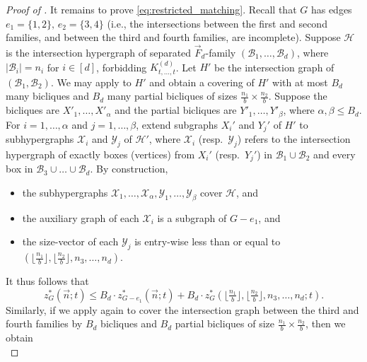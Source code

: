 \documentclass[11pt]{article}
\theoremstyle{definition}
\newcommand*{\cH}{\mathcal{H}}
\newcommand*{\vF}{\vec{F}}
\newcommand*{\cB}{\mathcal{B}}
\newcommand*{\cX}{\mathcal{X}}
\newcommand*{\cY}{\mathcal{Y}}
\newcommand*{\vn}{\vec{n}}
\begin{document}
\begin{proof}[Proof of ]
    It remains to prove \eqref{eq:restricted_matching}. Recall that $G$ has edges $e_1 = \{1, 2\}, \, e_2 = \{3, 4\}$ (i.e., the intersections between the first and second families, and between the third and fourth families, are incomplete). Suppose $\cH$ is the intersection hypergraph of separated $\vF_d$-family $(\cB_1, \dots, \cB_d)$, where $|\cB_i| = n_i$ for $i \in [d]$, forbidding $K_{t, \dots, t}^{(d)}$. Let $H'$ be the intersection graph of $(\cB_1, \cB_2)$. We may apply  to $H'$ and obtain a covering of $H'$ with at most $B_d$ many bicliques and $B_d$ many partial bicliques of sizes $\frac{n_1}{b} \times \frac{n_2}{b}$. Suppose the bicliques are $X'_1, \dots, X'_{\alpha}$ and the partial bicliques are $Y'_1, \dots, Y'_{\beta}$, where $\alpha, \beta \le B_d$. For $i = 1, \dots, \alpha$ and $j = 1, \dots, \beta$, extend subgraphs $X_i'$ and $Y_j'$ of $H'$ to subhypergraphs $\cX_i$ and $\cY_j$ of $\cH'$, where $\cX_i$ (resp.~$\cY_j$) refers to the intersection hypergraph of exactly boxes (vertices) from $X_i'$ (resp.~$Y_j'$) in $\cB_1 \cup \cB_2$ and every box in $\cB_3 \cup \dots \cup \cB_d$. By construction, 
    \vspace{-0.5em}
    \begin{itemize}
        \item the subhypergraphs $\cX_1, \dots, \cX_{\alpha}, \cY_1, \dots, \cY_{\beta}$ cover $\cH$, and 
        \vspace{-0.5em}
        \item the auxiliary graph of each $\cX_i$ is a subgraph of $G - e_1$, and 
        \vspace{-0.5em}
        \item the size-vector of each $\cY_j$ is entry-wise less than or equal to $(\lfloor \tfrac{n_1}{b} \rfloor, \lfloor \tfrac{n_2}{b} \rfloor, n_3, \dots, n_d)$. 
    \end{itemize}
    \vspace{-0.5em}
    It thus follows that
    \begin{equation} \label{eq:matching_est1}
        z^*_G(\vn; t) \le B_d \cdot z^*_{G-e_1}(\vn; t) + B_d \cdot z^*_G(\lfloor\tfrac{n_1}{b}\rfloor, \lfloor\tfrac{n_2}{b}\rfloor, n_3, \dots, n_d; t). 
    \end{equation}
    Similarly, if we apply  again to cover the intersection graph between the third and fourth families by $B_d$ bicliques and $B_d$ partial bicliques of size $\frac{n_1}{b} \times \frac{n_2}{b}$, then we obtain
    \begin{equation} \label{eq:matching_est2}

\end{equation}
\end{proof}
\end{document}
